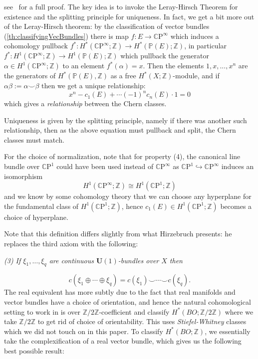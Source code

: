 \documentclass{ut-thesis}
\newenvironment{Proof}[1][]
  {\begin{ProofTcb}[#1]}
  {\end{ProofTcb}}
\newcommand{\Z}{{\mathbb{Z}}}
\renewcommand{\P}{{\mathbb{P}}}
\newcommand{\CP}{{\mathbb{C}\mathrm{P}}}
\begin{document}
\begin{Proof}
  see~\cite{NateKTheory} for a full proof. The key idea is to invoke the Leray-Hirsch Theorem for existence
  and the splitting principle for uniqueness. In fact, we get a bit more out of the Leray-Hirsch theorem: by the classification of
  vector bundles (\cref{th:classifyingVecBundles}) there is map $f:E \to \CP^\infty$ which induces a
  cohomology pullback $f^*: H^*(\CP^\infty;\Z) \to H^*\left(\P(E);\Z\right)$, in particular $f^*:
  H^1(\CP^\infty;\Z) \to H^1(\P(E); \Z)$ which pullback the generator $\alpha \in H^1(\CP^\infty;\Z)$ to an
  element $f^*(\alpha) = x$. Then the elements $1, x, ..., x^n$ are the generators of $H^*(\P(E), \Z)$ as a
  free $H^*(X; \Z)$-module, and if $\alpha\beta :=\alpha\smile \beta$ then we get a unique relationship:
  \[
    x^n - c_1(E) + \cdots (-1)^n c_n(E)\cdot 1 = 0
  \]
  which gives a \emph{relationship} between the Chern classes.

  Uniqueness is given by the splitting principle, namely if there was another such relationship, then as the
  above equation must pullback and split, the Chern classes must match.
\end{Proof}

For the choice of normalization, note that for property (4), the canonical line bundle over $\CP^1$ could have
been used instead of $\CP^\infty$ as $\CP^1 \hookrightarrow \CP^\infty$ induces an isomorphism
\[
	H^1(\CP^\infty; \Z) \cong H^1(\CP^1;\Z)
\]
and we know by some cohomology theory that we can choose any hyperplane for the fundamental class of
$H^1(\CP^1;\Z)$, hence $c_1(E) \in H^1(\CP^1;\Z)$ becomes a choice of hyperplane.

Note that this definition differs slightly from what Hirzebruch presents: he replaces the third axiom with the
following:
\begin{center}
  \emph{(3) If $\xi_1, \ldots, \xi_q$ are continuous $\mathbf{U}(1)$-bundles over $X$ then}
\end{center}
\[
    c(\xi_1 \oplus \cdots \oplus \xi_q) = c(\xi_1) \smile \cdots \smile c(\xi_q).
\]
The real equivalent has more subtly due to the fact that real manifolds and vector bundles have a choice of
orientation, and hence the natural cohomological setting to work in is over $\Z/2\Z$-coefficient and classify
$H^*(BO; \Z/2\Z)$ where we take $\Z/2\Z$ to get rid of choice of orientability. This uses
\emph{Stiefel-Whitney} classes which we did not touch on in this paper. To classify $H^*(BO; \Z)$, we
essentially take the complexification of a real vector bundle, which gives us the following best possible
result:
\end{document}
